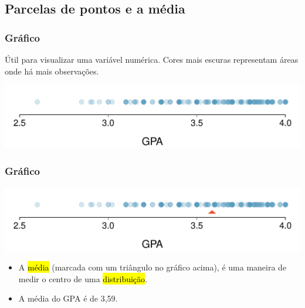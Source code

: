 
\subsection{Parcelas de pontos e a média}


\begin{frame}
\frametitle{Gráfico}
\justifying
Útil para visualizar uma variável numérica. Cores mais escuras representam áreas onde há mais observações.

\begin{center}
\includegraphics[width=\textwidth]{1-6_numerical_data/gpa_dot_plot.pdf}
\end{center}
\justifying
{}

\end{frame}



\begin{frame}
\frametitle{Gráfico}

\begin{center}
\includegraphics[width=\textwidth]{1-6_numerical_data/gpa_dot_plot_mean.pdf}
\end{center}

\begin{itemize}
\justifying
\item A \hl {média} (marcada com um triângulo no gráfico acima), é uma maneira de medir o centro de uma \hl {distribuição}.
\justifying
\item A média do GPA é de 3,59.

\end{itemize} 

\end{frame}


